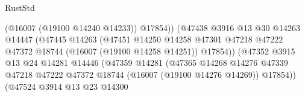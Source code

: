 \begin{lexlean}{RustStd}
\begin{coremodule}
                                                    (@16007 (@19100 @14240 @14233))
                                                    @17854))
                                                (@47438
                                                  @3916
                                                  @13
                                                  @30
                                                  @14263
                                                  @14447
                                                  (@47445
                                                    @14263
                                                    (@47451
                                                      @14250
                                                      @14258
                                                      @47301
                                                      @47218
                                                      @47222
                                                      @47372
                                                      @18744
                                                      (@16007 (@19100 @14258 @14251))
                                                      @17854))
                                                  (@47352
                                                    @3915
                                                    @13
                                                    @24
                                                    @14281
                                                    @14446
                                                    (@47359
                                                      @14281
                                                      (@47365
                                                        @14268
                                                        @14276
                                                        @47339
                                                        @47218
                                                        @47222
                                                        @47372
                                                        @18744
                                                        (@16007 (@19100 @14276 @14269))
                                                        @17854))
                                                    (@47524
                                                      @3914
                                                      @13
                                                      @23
                                                      @14300

\end{coremodule}
\end{lexlean}
